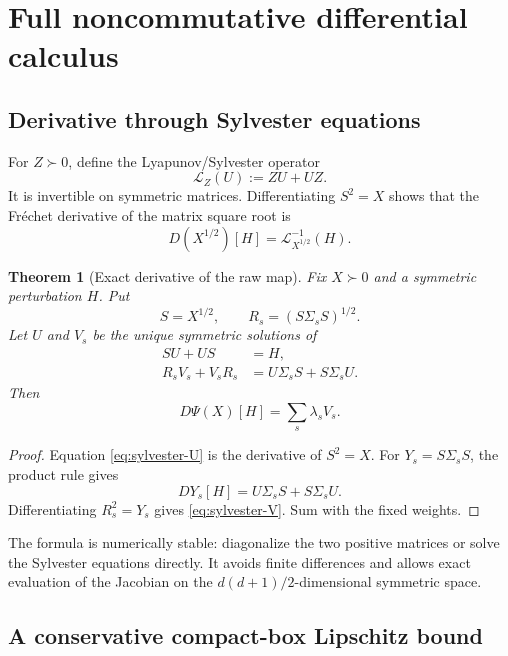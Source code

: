 \documentclass[11pt]{article}
\newtheorem{theorem}{Theorem}[section]
\theoremstyle{definition}
\newcommand{\cL}{\mathcal L}
\begin{document}
\section{Full noncommutative differential calculus}

\subsection{Derivative through Sylvester equations}

For $Z\succ0$, define the Lyapunov/Sylvester operator
\begin{equation}\label{eq:lyapunov}
 \cL_Z(U):=ZU+UZ.
\end{equation}
It is invertible on symmetric matrices.  Differentiating $S^2=X$ shows that
the Fr\'echet derivative of the matrix square root is
\begin{equation}\label{eq:dsqrt}
 D(X^{1/2})[H]=\cL_{X^{1/2}}^{-1}(H).
\end{equation}

\begin{theorem}[Exact derivative of the raw map]\label{thm:frechet-derivative}
Fix $X\succ0$ and a symmetric perturbation $H$.  Put
\[
 S=X^{1/2},\qquad R_s=(S\Sigma_sS)^{1/2}.
\]
Let $U$ and $V_s$ be the unique symmetric solutions of
\begin{align}
 SU+US&=H,\label{eq:sylvester-U}\\
 R_sV_s+V_sR_s&=U\Sigma_sS+S\Sigma_sU.
 \label{eq:sylvester-V}
\end{align}
Then
\begin{equation}\label{eq:Dpsi}
 \boxed{D\Psi(X)[H]=\sum_s\lambda_sV_s.}
\end{equation}
\end{theorem}

\begin{proof}
Equation \eqref{eq:sylvester-U} is the derivative of $S^2=X$.  For
$Y_s=S\Sigma_sS$, the product rule gives
\[
 DY_s[H]=U\Sigma_sS+S\Sigma_sU.
\]
Differentiating $R_s^2=Y_s$ gives \eqref{eq:sylvester-V}.  Sum with the fixed
weights.
\end{proof}

The formula is numerically stable: diagonalize the two positive matrices or
solve the Sylvester equations directly.  It avoids finite differences and
allows exact evaluation of the Jacobian on the $d(d+1)/2$-dimensional
symmetric space.

\subsection{A conservative compact-box Lipschitz bound}
\end{document}
